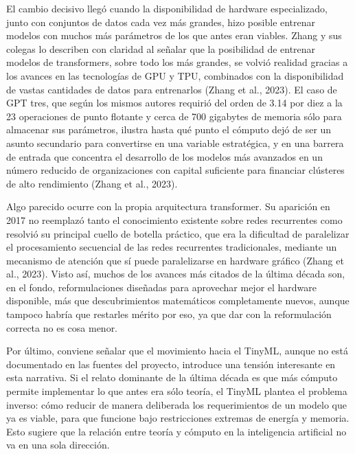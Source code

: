 \documentclass[12pt,letterpaper]{article}
\begin{document}
El cambio decisivo lleg\'o cuando la disponibilidad de hardware especializado, junto con conjuntos de datos cada vez m\'as grandes, hizo posible entrenar modelos con muchos m\'as par\'ametros de los que antes eran viables. Zhang y sus colegas lo describen con claridad al se\~nalar que la posibilidad de entrenar modelos de transformers, sobre todo los m\'as grandes, se volvi\'o realidad gracias a los avances en las tecnolog\'ias de GPU y TPU, combinados con la disponibilidad de vastas cantidades de datos para entrenarlos (Zhang et al., 2023). El caso de GPT tres, que seg\'un los mismos autores requiri\'o del orden de 3.14 por diez a la 23 operaciones de punto flotante y cerca de 700 gigabytes de memoria s\'olo para almacenar sus par\'ametros, ilustra hasta qu\'e punto el c\'omputo dej\'o de ser un asunto secundario para convertirse en una variable estrat\'egica, y en una barrera de entrada que concentra el desarrollo de los modelos m\'as avanzados en un n\'umero reducido de organizaciones con capital suficiente para financiar cl\'usteres de alto rendimiento (Zhang et al., 2023).

Algo parecido ocurre con la propia arquitectura transformer. Su aparici\'on en 2017 no reemplaz\'o tanto el conocimiento existente sobre redes recurrentes como resolvi\'o su principal cuello de botella pr\'actico, que era la dificultad de paralelizar el procesamiento secuencial de las redes recurrentes tradicionales, mediante un mecanismo de atenci\'on que s\'i puede paralelizarse en hardware gr\'afico (Zhang et al., 2023). Visto as\'i, muchos de los avances m\'as citados de la \'ultima d\'ecada son, en el fondo, reformulaciones dise\~nadas para aprovechar mejor el hardware disponible, m\'as que descubrimientos matem\'aticos completamente nuevos, aunque tampoco habr\'ia que restarles m\'erito por eso, ya que dar con la reformulaci\'on correcta no es cosa menor.

Por \'ultimo, conviene se\~nalar que el movimiento hacia el TinyML, aunque no est\'a documentado en las fuentes del proyecto, introduce una tensi\'on interesante en esta narrativa. Si el relato dominante de la \'ultima d\'ecada es que m\'as c\'omputo permite implementar lo que antes era s\'olo teor\'ia, el TinyML plantea el problema inverso: c\'omo reducir de manera deliberada los requerimientos de un modelo que ya es viable, para que funcione bajo restricciones extremas de energ\'ia y memoria. Esto sugiere que la relaci\'on entre teor\'ia y c\'omputo en la inteligencia artificial no va en una sola direcci\'on.
\end{document}
